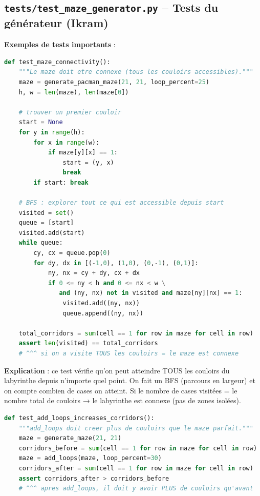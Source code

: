 \documentclass[12pt,a4paper]{article}
\begin{document}
\subsection{\texttt{tests/test\_maze\_generator.py} -- Tests du générateur (Ikram)}

\textbf{Exemples de tests importants} :

\begin{lstlisting}[language=Python, caption={Test de connexité : BFS pour vérifier que tout est accessible}]
def test_maze_connectivity():
    """Le maze doit etre connexe (tous les couloirs accessibles)."""
    maze = generate_pacman_maze(21, 21, loop_percent=25)
    h, w = len(maze), len(maze[0])

    # trouver un premier couloir
    start = None
    for y in range(h):
        for x in range(w):
            if maze[y][x] == 1:
                start = (y, x)
                break
        if start: break

    # BFS : explorer tout ce qui est accessible depuis start
    visited = set()
    queue = [start]
    visited.add(start)
    while queue:
        cy, cx = queue.pop(0)
        for dy, dx in [(-1,0), (1,0), (0,-1), (0,1)]:
            ny, nx = cy + dy, cx + dx
            if 0 <= ny < h and 0 <= nx < w \
               and (ny, nx) not in visited and maze[ny][nx] == 1:
                visited.add((ny, nx))
                queue.append((ny, nx))

    total_corridors = sum(cell == 1 for row in maze for cell in row)
    assert len(visited) == total_corridors
    # ^^^ si on a visite TOUS les couloirs = le maze est connexe
\end{lstlisting}

\textbf{Explication} : ce test vérifie qu'on peut atteindre TOUS les couloirs du labyrinthe depuis n'importe quel point. On fait un BFS (parcours en largeur) et on compte combien de cases on atteint. Si le nombre de cases visitées = le nombre total de couloirs → le labyrinthe est connexe (pas de zones isolées).

\begin{lstlisting}[language=Python, caption={Test que add\_loops crée bien des couloirs supplémentaires}]
def test_add_loops_increases_corridors():
    """add_loops doit creer plus de couloirs que le maze parfait."""
    maze = generate_maze(21, 21)
    corridors_before = sum(cell == 1 for row in maze for cell in row)
    maze = add_loops(maze, loop_percent=30)
    corridors_after = sum(cell == 1 for row in maze for cell in row)
    assert corridors_after > corridors_before
    # ^^^ apres add_loops, il doit y avoir PLUS de couloirs qu'avant
\end{lstlisting}
\end{document}
